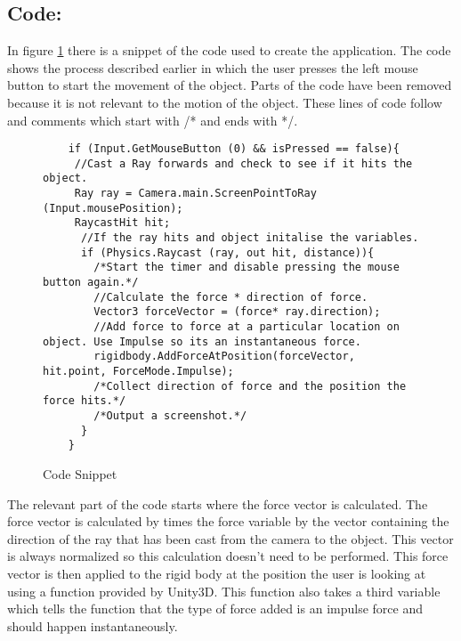 \subsection{Code:}
In figure \ref*{sc:SourceCode} there is a snippet of the code used to create the application.
The code shows the process described earlier in which the user presses the left mouse button to start the movement of the object.
Parts of the code have been removed because it is not relevant to the motion of the object.
These lines of code follow and comments which start with /* and ends with */. 

\begin{figure}[H]
	\centering
	\begin{lstlisting}
	if (Input.GetMouseButton (0) && isPressed == false){
	 //Cast a Ray forwards and check to see if it hits the object.
	 Ray ray = Camera.main.ScreenPointToRay (Input.mousePosition);
	 RaycastHit hit;
	  //If the ray hits and object initalise the variables.
	  if (Physics.Raycast (ray, out hit, distance)){
		/*Start the timer and disable pressing the mouse button again.*/
		//Calculate the force * direction of force.
		Vector3 forceVector = (force* ray.direction);
		//Add force to force at a particular location on object. Use Impulse so its an instantaneous force.
		rigidbody.AddForceAtPosition(forceVector, hit.point, ForceMode.Impulse);
		/*Collect direction of force and the position the force hits.*/
		/*Output a screenshot.*/
	  }
	}
	\end{lstlisting}
	\caption{Code Snippet}
	\label{sc:SourceCode}
\end{figure}

The relevant part of the code starts where the force vector is calculated.
The force vector is calculated by times the force variable by the vector containing the direction of the ray that has been cast from the camera to the object.
This vector is always normalized so this calculation doesn't need to be performed.
This force vector is then applied to the rigid body at the position the user is looking at using a function provided by Unity3D.
This function also takes a third variable which tells the function that the type of force added is an impulse force and should happen instantaneously.
